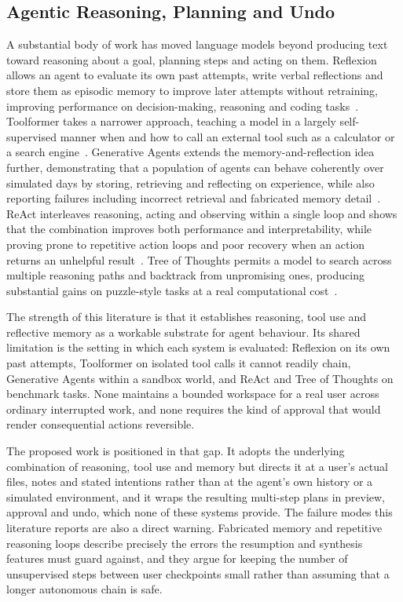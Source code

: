 \documentclass{FastFyp}
\begin{document}
\subsection{Agentic Reasoning, Planning and Undo}
A substantial body of work has moved language models beyond producing text toward reasoning about a goal, planning steps and acting on them. Reflexion allows an agent to evaluate its own past attempts, write verbal reflections and store them as episodic memory to improve later attempts without retraining, improving performance on decision-making, reasoning and coding tasks~\cite{ref:shinn2023}. Toolformer takes a narrower approach, teaching a model in a largely self-supervised manner when and how to call an external tool such as a calculator or a search engine~\cite{ref:schick2023}. Generative Agents extends the memory-and-reflection idea further, demonstrating that a population of agents can behave coherently over simulated days by storing, retrieving and reflecting on experience, while also reporting failures including incorrect retrieval and fabricated memory detail~\cite{ref:park2023}. ReAct interleaves reasoning, acting and observing within a single loop and shows that the combination improves both performance and interpretability, while proving prone to repetitive action loops and poor recovery when an action returns an unhelpful result~\cite{ref:yao2023react}. Tree of Thoughts permits a model to search across multiple reasoning paths and backtrack from unpromising ones, producing substantial gains on puzzle-style tasks at a real computational cost~\cite{ref:yao2023tot}.

The strength of this literature is that it establishes reasoning, tool use and reflective memory as a workable substrate for agent behaviour. Its shared limitation is the setting in which each system is evaluated: Reflexion on its own past attempts, Toolformer on isolated tool calls it cannot readily chain, Generative Agents within a sandbox world, and ReAct and Tree of Thoughts on benchmark tasks. None maintains a bounded workspace for a real user across ordinary interrupted work, and none requires the kind of approval that would render consequential actions reversible.

The proposed work is positioned in that gap. It adopts the underlying combination of reasoning, tool use and memory but directs it at a user's actual files, notes and stated intentions rather than at the agent's own history or a simulated environment, and it wraps the resulting multi-step plans in preview, approval and undo, which none of these systems provide. The failure modes this literature reports are also a direct warning. Fabricated memory and repetitive reasoning loops describe precisely the errors the resumption and synthesis features must guard against, and they argue for keeping the number of unsupervised steps between user checkpoints small rather than assuming that a longer autonomous chain is safe.
\end{document}
